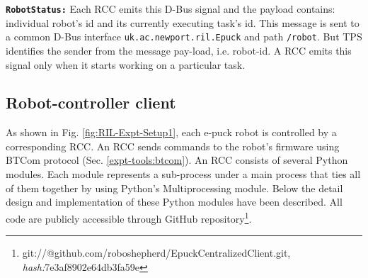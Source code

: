 \textbf{\texttt{RobotStatus:}} Each RCC emits this D-Bus signal and the payload contains: individual robot's id and its currently executing task's id. This message is sent to a common D-Bus interface \texttt{uk.ac.newport.ril.Epuck} and path \texttt{/robot}.  But TPS identifies the sender from the message pay-load, i.e. robot-id. A RCC emits this signal only when it starts working on a particular task. 
\subsection{Robot-controller client}
As shown in Fig. \ref{fig:RIL-Expt-Setup1}, each e-puck robot is controlled by a corresponding RCC. An RCC sends commands to the robot's firmware using BTCom protocol  (Sec. \ref{expt-tools:btcom}).
An RCC consists of several Python modules. Each module represents a sub-process under a main process that ties all of them together by using Python's Multiprocessing module. Below  the detail design and implementation of these Python modules  have been described. All code are publicly accessible through GitHub repository\footnote{git://@github.com/roboshepherd/EpuckCentralizedClient.git,    
\textit{hash:}7e3af8902e64db3fa59e}.
